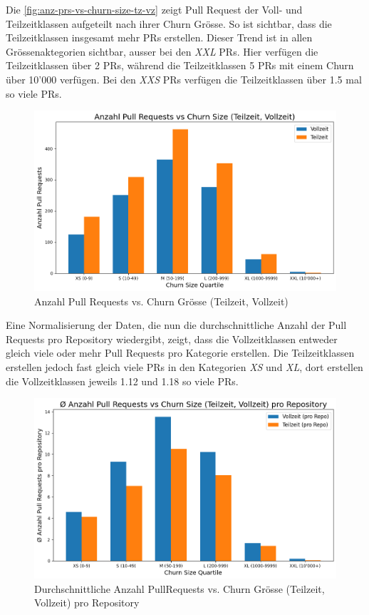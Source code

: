 Die \autoref{fig:anz-prs-vs-churn-size-tz-vz} zeigt Pull Request der Voll- und Teilzeitklassen aufgeteilt nach ihrer Churn Grösse. So ist sichtbar, dass die Teilzeitklassen insgesamt mehr PRs erstellen. Dieser Trend ist in allen Grössenaktegorien sichtbar, ausser bei den \textit{XXL} PRs. Hier verfügen die Teilzeitklassen  über 2 PRs, während die Teilzeitklassen 5 PRs mit einem Churn über 10'000 verfügen. Bei den \textit{XXS} PRs verfügen die Teilzeitklassen über 1.5 mal so viele PRs.

\begin{figure}[htbp]
    \includegraphics[width=\textwidth]{Figures/anz-prs-vs-churn-size-tz-vz.png}
    \caption{Anzahl Pull Requests vs. Churn Grösse (Teilzeit, Vollzeit)}
    \label{fig:anz-prs-vs-churn-size-tz-vz}
\end{figure}

Eine Normalisierung der Daten, die nun die durchschnittliche Anzahl der Pull Requests pro Repository wiedergibt, zeigt, dass die Vollzeitklassen entweder gleich viele oder mehr Pull Requests pro Kategorie erstellen. Die Teilzeitklassen erstellen jedoch fast gleich viele PRs in den Kategorien \textit{XS} und \textit{XL}, dort erstellen die Vollzeitklassen jeweils 1.12 und 1.18 so viele PRs. 

\begin{figure}[htbp]
    \includegraphics[width=\textwidth]{Figures/avg-anz-prs-vs-churn-size-tz-vz-pro-repo.png}
    \caption{Durchschnittliche Anzahl PullRequests vs. Churn Grösse (Teilzeit, Vollzeit) pro Repository}
    \label{fig:anz-prs-vs-churn-size-tz-vz}
\end{figure}

